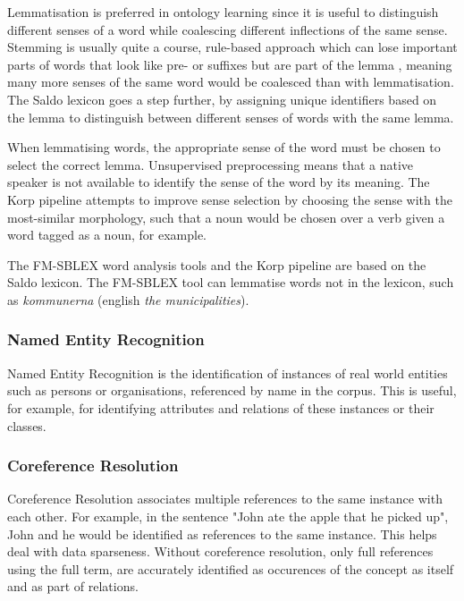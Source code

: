 \documentclass[a4paper]{report}
\newcommand{\todo}[1]{}
\begin{document}
Lemmatisation is preferred in ontology learning since it is useful to distinguish different senses of a word while coalescing different inflections of the same sense.
Stemming is usually quite a course, rule-based approach which can lose important parts of words that look like pre- or suffixes but are part of the lemma \todo{ought to cite this, \citep{Gacitua08OntoLancs} says \citep{Alkula01MeaningWords} deals with this.}, meaning many more senses of the same word would be coalesced than with lemmatisation.
The Saldo lexicon \cite{Borin09Saldo} goes a step further, by assigning unique identifiers based on the lemma to distinguish between different senses of words with the same lemma.

When lemmatising words, the appropriate sense of the word must be chosen to select the correct lemma.
Unsupervised preprocessing means that a native speaker is not available to identify the sense of the word by its meaning.
The Korp pipeline attempts to improve sense selection by choosing the sense with the most-similar morphology, such that a noun would be chosen over a verb given a word tagged as a noun, for example.

The FM-SBLEX word analysis tools and the Korp pipeline are based on the Saldo lexicon.
The FM-SBLEX tool can lemmatise words not in the lexicon, such as \emph{kommunerna} (english \emph{the municipalities}).


\subsubsection{Named Entity Recognition}

Named Entity Recognition is the identification of instances of real world entities such as persons or organisations, referenced by name in the corpus.
This is useful, for example, for identifying attributes and relations of these instances or their classes.

\subsubsection{Coreference Resolution}

Coreference Resolution associates multiple references to the same instance with each other.
For example, in the sentence "John ate the apple that he picked up", John and he would be identified as references to the same instance.
This helps deal with data sparseness.
Without coreference resolution, only full references using the full term, are accurately identified as occurences of the concept as itself and as part of relations.
\end{document}
